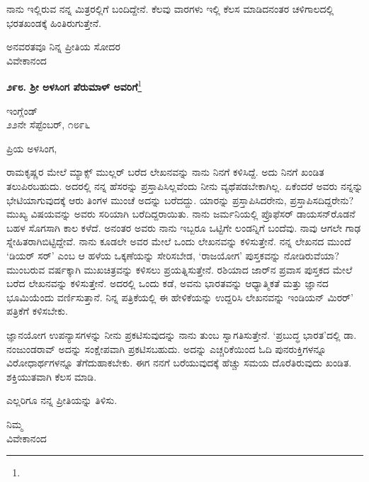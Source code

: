 ನಾನು ಇಲ್ಲಿರುವ ನನ್ನ ಮಿತ್ರರಲ್ಲಿಗೆ ಬಂದಿದ್ದೇನೆ. ಕೆಲವು ವಾರಗಳು ಇಲ್ಲಿ ಕೆಲಸ ಮಾಡಿದನಂತರ ಚಳಿಗಾಲದಲ್ಲಿ ಭರತಖಂಡಕ್ಕೆ ಹಿಂತಿರುಗುತ್ತೇನೆ.

{\flushright
ಅನವರತವೂ ನಿನ್ನ ಪ್ರೀತಿಯ ಸೋದರ\\ವಿವೇಕಾನಂದ\par}

\newpage

\begin{center}
\textbf{೨೯೮. ಶ‍್ರೀ ಅಳಸಿಂಗ ಪೆರುಮಾಳ್ ಅವರಿಗೆ}\footnote{}
\end{center}

\vspace{-0.5cm}

\begin{flushright}
ಇಂಗ್ಲೆಂಡ್\\೨೨ನೇ ಸೆಪ್ಟೆಂಬರ್, ೧೮೯೬
\end{flushright}

\noindent
ಪ್ರಿಯ ಅಳಸಿಂಗ,

ರಾಮಕೃಷ್ಣರ ಮೇಲೆ ಮ್ಯಾಕ್ಸ್ ಮುಲ್ಲರ್ ಬರೆದ ಲೇಖನವನ್ನು ನಾನು ನಿನಗೆ ಕಳಿಸಿದ್ದೆ. ಅದು ನಿನಗೆ ಖಂಡಿತ ತಲುಪಿರಬಹುದು. ಅದರಲ್ಲಿ ನನ್ನ ಹೆಸರನ್ನು ಪ್ರಸ್ತಾಪಿಸಿಲ್ಲವೆಂದು ನೀನು ವ್ಯಥೆಪಡಬೇಕಾಗಿಲ್ಲ. ಏಕೆಂದರೆ ಅವರು ನನ್ನನ್ನು ಭೇಟಿಯಾಗುವುದಕ್ಕೆ ಆರು ತಿಂಗಳ ಮುಂಚೆ ಅದನ್ನು ಬರೆದದ್ದು. ಯಾರನ್ನು ಪ್ರಸ್ತಾಪಿಸಿದರೇನು, ಪ್ರಸ್ತಾಪಿಸದಿದ್ದರೇನು? ಮುಖ್ಯ ವಿಷಯವನ್ನು ಅವರು ಸರಿಯಾಗಿ ಬರೆದಿದ್ದರಾಯಿತು. ನಾನು ಜರ್ಮನಿಯಲ್ಲಿ ಪ್ರೊಫೆಸರ್ ಡಾಯಸನ್‌ರೊಡನೆ ಬಹಳ ಸೊಗಸಾಗಿ ಕಾಲ ಕಳೆದೆ. ಅನಂತರ ಅವರು ನಾನು ಇಬ್ಬರೂ ಒಟ್ಟಿಗೇ ಲಂಡನ್ನಿಗೆ ಬಂದೆವು. ನಾವು ಆಗಲೇ ಗಾಢ ಸ್ನೇಹಿತರಾಗಿಬಿಟ್ಟಿದ್ದೇವೆ. ನಾನು ಕೂಡಲೇ ಅವರ ಮೇಲೆ ಒಂದು ಲೇಖನವನ್ನು ಕಳಿಸುತ್ತೇನೆ. ನನ್ನ ಲೇಖನದ ಮುಂದೆ ‘ಡಿಯರ್ ಸರ್’ ಎಂಬ ಆ ಹಳೆಯ ಒಕ್ಕಣೆಯನ್ನು ಸೇರಿಸಬೇಡ, ‘ರಾಜಯೋಗ’ ಪುಸ್ತಕವನ್ನು ನೋಡಿರುವೆಯಾ?ಮುಂಬರುವ ವರ್ಷಕ್ಕಾಗಿ ಮುಖಚಿತ್ರವನ್ನು ಕಳಿಸಲು ಪ್ರಯತ್ನಿಸುತ್ತೇನೆ. ರಶಿಯಾದ ಜಾರ್‌ನ ಪ್ರವಾಸ ಪುಸ್ತಕದ ಮೇಲೆ ಬರೆದ ಲೇಖನವನ್ನು ಕಳಿಸುತ್ತೇನೆ. ಅದರಲ್ಲಿ ಒಂದು ಕಡೆ, ಅವನು ಭಾರತವನ್ನು ಆಧ್ಯಾತ್ಮಿಕತೆ ಮತ್ತು ಜ್ಞಾನದ ಭೂಮಿಯೆಂದು ವರ್ಣಿಸುತ್ತಾನೆ. ನಿನ್ನ ಪತ್ರಿಕೆಯಲ್ಲಿ ಈ ಹೇಳಿಕೆಯನ್ನು ಉದ್ದರಿಸಿ ಲೇಖನವನ್ನು ಇಂಡಿಯನ್ ಮಿರರ್’ ಪತ್ರಿಕೆಗೆ ಕಳಿಸಬೇಕು.

ಜ್ಞಾನಯೋಗ ಉಪನ್ಯಾಸಗಳನ್ನು ನೀನು ಪ್ರಕಟಿಸುವುದನ್ನು ನಾನು ತುಂಬ ಸ್ವಾಗತಿಸುತ್ತೇನೆ. ‘ಪ್ರಬುದ್ಧ ಭಾರತ’ದಲ್ಲಿ ಡಾ. ನಂಜುಂಡರಾವ್ ಅದನ್ನು ಸಂಕ್ಷೇಪವಾಗಿ ಪ್ರಕಟಿಸಬಹುದು. ಅದನ್ನು ಎಚ್ಚರಿಕೆಯಿಂದ ಓದಿ ಪುನರುಕ್ತಿಗಳನ್ನೂ ವಿರೋಧಾರ್ಥಗಳನ್ನೂ ತೆಗೆದುಹಾಕಬೇಕು. ಈಗ ನನಗೆ ಬರೆಯುವುದಕ್ಕೆ ಹೆಚ್ಚು ಸಮಯ ದೊರೆತಿರುವುದು ಖಂಡಿತ. ಶಕ್ತಿಯುತವಾಗಿ ಕೆಲಸ ಮಾಡಿ.

ಎಲ್ಲರಿಗೂ ನನ್ನ ಪ್ರೀತಿಯನ್ನು ತಿಳಿಸು.

\vspace{-0.5cm}

{\flushright
ನಿಮ್ಮ\\ವಿವೇಕಾನಂದ\par}


